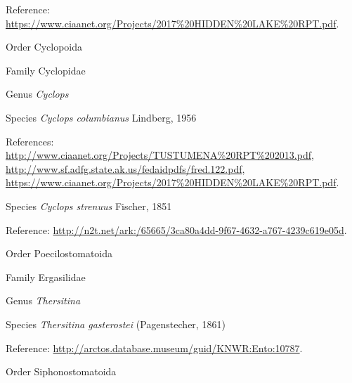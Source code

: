 \documentclass[9pt, article]{memoir}
\begin{document}
\begin{multicols}{2}
\vspace{6pt}Reference: 
\url{https://www.ciaanet.org/Projects/2017%20HIDDEN%20LAKE%20RPT.pdf}.

\vspace{6pt}\noindent\hspace{18pt}Order Cyclopoida


\vspace{6pt}\noindent\hspace{24pt}Family Cyclopidae


\vspace{6pt}\noindent\hspace{30pt}Genus \textit{Cyclops}


\vspace{6pt}\noindent\hspace{36pt}Species \textit{Cyclops columbianus} Lindberg, 1956


\vspace{6pt}References: 
\url{http://www.ciaanet.org/Projects/TUSTUMENA%20RPT%202013.pdf}, 
\url{http://www.sf.adfg.state.ak.us/fedaidpdfs/fred.122.pdf}, 
\url{https://www.ciaanet.org/Projects/2017%20HIDDEN%20LAKE%20RPT.pdf}.

\vspace{6pt}\noindent\hspace{36pt}Species \textit{Cyclops strenuus} Fischer, 1851


\vspace{6pt}Reference: 
\url{http://n2t.net/ark:/65665/3ca80a4dd-9f67-4632-a767-4239c619e05d}.

\vspace{6pt}\noindent\hspace{18pt}Order Poecilostomatoida


\vspace{6pt}\noindent\hspace{24pt}Family Ergasilidae


\vspace{6pt}\noindent\hspace{30pt}Genus \textit{Thersitina}


\vspace{6pt}\noindent\hspace{36pt}Species \textit{Thersitina gasterostei} (Pagenstecher, 1861)


\vspace{6pt}Reference: 
\url{http://arctos.database.museum/guid/KNWR:Ento:10787}.

\vspace{6pt}\noindent\hspace{18pt}Order Siphonostomatoida



\end{multicols}
\end{document}
